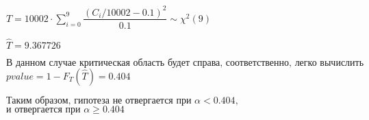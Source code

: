 \documentclass[13pt,a4paper]{scrartcl}
\def\suml{\sum\limits}
\def\a{\alpha}
\begin{document}
\def\delim{C_i / 10002}

\(T = 10002\cdot  \suml_{i = 0}^{9} \dfrac{(\delim - 0.1)^2 }{0.1 } \sim  \chi^2(9)\)

\(\hat T = 9.367726\)

\(\text{В }\allowbreak \text{данном }\allowbreak \text{случае }\allowbreak \text{критическая }\allowbreak \text{область }\allowbreak \text{будет }\allowbreak \text{справа, }\allowbreak \text{соответственно, }\allowbreak \text{легко }\allowbreak \text{вычислить}\allowbreak \)
\(pvalue = 1 - F_T(\hat T) = 0.404\)

\(\text{Таким }\allowbreak \text{образом, }\allowbreak \text{гипотеза }\allowbreak \text{не }\allowbreak \text{отвергается }\allowbreak \text{при }\allowbreak \a < 0.404,\)
\(\text{и }\allowbreak \text{отвергается }\allowbreak \text{при }\allowbreak \a \ge  0.404\)
\end{document}
